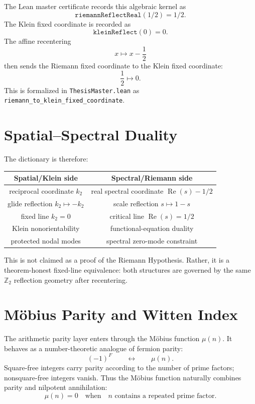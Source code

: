 The Lean master certificate records this algebraic kernel as
\begin{equation}
    \texttt{riemannReflectReal}(1/2)=1/2.
\end{equation}
The Klein fixed coordinate is recorded as
\begin{equation}
    \texttt{kleinReflect}(0)=0.
\end{equation}
The affine recentering
\begin{equation}
    x\mapsto x-\frac12
\end{equation}
then sends the Riemann fixed coordinate to the Klein fixed coordinate:
\begin{equation}
    \frac12\mapsto0.
\end{equation}
This is formalized in \texttt{ThesisMaster.lean} as \texttt{riemann\_to\_klein\_fixed\_coordinate}.

\section{Spatial--Spectral Duality}

The dictionary is therefore:
\begin{center}
\begin{tabular}{c|c}
\textbf{Spatial/Klein side} & \textbf{Spectral/Riemann side} \\
\hline
reciprocal coordinate $k_2$ & real spectral coordinate $\operatorname{Re}(s)-1/2$ \\
glide reflection $k_2\mapsto-k_2$ & scale reflection $s\mapsto1-s$ \\
fixed line $k_2=0$ & critical line $\operatorname{Re}(s)=1/2$ \\
Klein nonorientability & functional-equation duality \\
protected nodal modes & spectral zero-mode constraint
\end{tabular}
\end{center}

This is not claimed as a proof of the Riemann Hypothesis.  Rather, it is a theorem-honest fixed-line equivalence: both structures are governed by the same $\mathbb{Z}_2$ reflection geometry after recentering.

\section{Möbius Parity and Witten Index}

The arithmetic parity layer enters through the Möbius function $\mu(n)$.  It behaves as a number-theoretic analogue of fermion parity:
\begin{equation}
    (-1)^F
    \qquad\leftrightarrow\qquad
    \mu(n).
\end{equation}
Square-free integers carry parity according to the number of prime factors; nonsquare-free integers vanish.  Thus the Möbius function naturally combines parity and nilpotent annihilation:
\begin{equation}
    \mu(n)=0
    \quad\text{when}\quad
    n\text{ contains a repeated prime factor}.
\end{equation}

